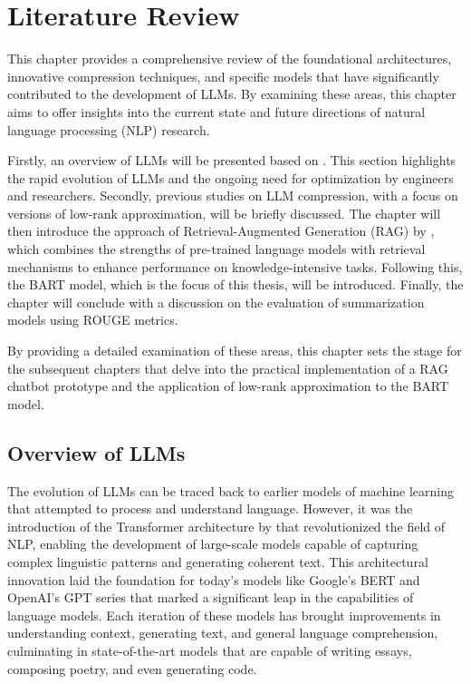 \chapter{Literature Review}\label{chap:literature_review}
This chapter provides a comprehensive review of the foundational architectures, innovative compression techniques, and specific models that have significantly contributed to the development of LLMs. By examining these areas, this chapter aims to offer insights into the current state and future directions of natural language processing (NLP) research.

Firstly, an overview of LLMs will be presented based on \cite{naveed2024comprehensive}. This section highlights the rapid evolution of LLMs and the ongoing need for optimization by engineers and researchers. Secondly, previous studies on LLM compression, with a focus on versions of low-rank approximation, will be briefly discussed. The chapter will then introduce the approach of Retrieval-Augmented Generation (RAG) by \cite{lewis2020RAG}, which combines the strengths of pre-trained language models with retrieval mechanisms to enhance performance on knowledge-intensive tasks. Following this, the BART model, which is the focus of this thesis, will be introduced. Finally, the chapter will conclude with a discussion on the evaluation of summarization models using ROUGE metrics.

By providing a detailed examination of these areas, this chapter sets the stage for the subsequent chapters that delve into the practical implementation of a RAG chatbot prototype and the application of low-rank approximation to the BART model.

\section{Overview of LLMs}
The evolution of LLMs can be traced back to earlier models of machine learning that attempted to process and understand language. However, it was the introduction of the Transformer architecture by \cite{vaswani2023attention} that revolutionized the field of NLP, enabling the development of large-scale models capable of capturing complex linguistic patterns and generating coherent text. This architectural innovation laid the foundation for today's models like Google's BERT and OpenAI's GPT series that marked a significant leap in the capabilities of language models. Each iteration of these models has brought improvements in understanding context, generating text, and general language comprehension, culminating in state-of-the-art models that are capable of writing essays, composing poetry, and even generating code.

